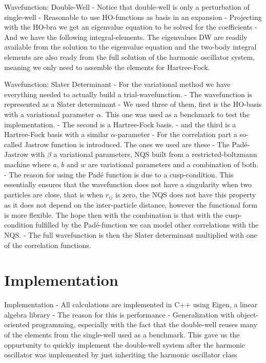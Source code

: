 \documentclass[10pt]{beamer}
\begin{document}
\begin{frame}[fragile]{Wavefunction: Double-Well}
    - Notice that double-well is only a perturbation of single-well
    - Reasonable to use HO-functions as basis in an expansion
    - Projecting with the HO-bra we get an eigenvalue equation to be solved for
    the coefficients
    - And we have the following integral-elements. The eigenvalues DW are
    readily available from the solution to the eigenvalue equation and the
    two-body integral elements are also ready from the full solution of the
    harmonic oscillator system, meaning we only need to assemble the elements
    for Hartree-Fock.
\end{frame}

\begin{frame}[fragile]{Wavefunction: Slater Determinant}
    - For the variational method we have everything needed to actually build a
    trial-wavefunction.
    - The wavefunction is represented as a Slater determinant
    - We used three of them, first is the HO-basis with a variational parameter
    $\alpha$. This one was used as a benchmark to test the implementation.
    - The second is a Hartree-Fock basis.
    - and the third is a Hartree-Fock basis with a similar $\alpha$-parameter
    - For the correlation part a so-called Jastrow function is introduced. The
    ones we used are these
    - The Pad\'e-Jastrow with $\beta$ a variational parameters, NQS built from
    a restricted-boltzmann machine where $a$, $b$ and $w$ are variational
    parameters and a combination of both.
    - The reason for using the Pad\'e function is due to a cusp-condition. This
    essentially ensures that the wavefunction does not have a singularity when
    two particles are close, that is when $r_{ij}$ is zero, the NQS does not
    have this property as it does not depend on the inter-particle distance,
    however the functional form is more flexible. The hope then with the
    combination is that with the cusp-condition fulfilled by the
    Pad\'e-function we can model other correlations with the NQS.
    - The full wavefunction is then the Slater determinant multiplied with one
    of the correlation functions.
\end{frame}

\section{Implementation}

\begin{frame}[fragile]{Implementation}
    \CC
        - All calculations are implemented in C++ using Eigen, a linear algebra library
        - The reason for this is performance
        - Generalization with object-oriented programming, especially with the
        fact that the double-well reuses many of the elements from the
        single-well used as a benchmark. This gave us the oppurtunity to
        quickly implement the double-well system after the harmonic oscillator
        was implemented by just inheriting the harmonic oscillator class
\end{frame}
\end{document}
